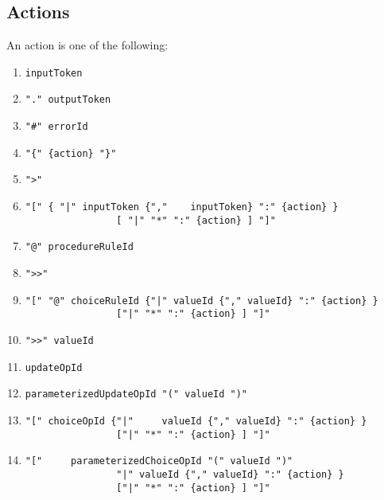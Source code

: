 \subsection{Actions}

An action is one of the following:
\begin{enumerate}
\item 
\begin{verbatim}
inputToken
\end{verbatim}
\item 
\begin{verbatim}
"." outputToken
\end{verbatim}
           
\item 
\begin{verbatim}
"#" errorId
\end{verbatim}
\item 
\begin{verbatim}
"{" {action} "}"
\end{verbatim}
\item 
\begin{verbatim}
">"
\end{verbatim}
\item 
\begin{verbatim}
"[" { "|" inputToken {","    inputToken} ":" {action} }
                [ "|" "*" ":" {action} ] "]"
\end{verbatim}
\item 
\begin{verbatim}
"@" procedureRuleId
\end{verbatim}
\item 
\begin{verbatim}
">>"
\end{verbatim}
\item 
\begin{verbatim}
"[" "@" choiceRuleId {"|" valueId {"," valueId} ":" {action} }
                ["|" "*" ":" {action} ] "]"
\end{verbatim}
                  
\item 
\begin{verbatim}
">>" valueId
\end{verbatim}
\item 
\begin{verbatim}
updateOpId
\end{verbatim}
\item 
\begin{verbatim}
parameterizedUpdateOpId "(" valueId ")"
\end{verbatim}
\item 
\begin{verbatim}
"[" choiceOpId {"|"     valueId {"," valueId} ":" {action} }
                ["|" "*" ":" {action} ] "]"
\end{verbatim}
\item 
\begin{verbatim}
"["     parameterizedChoiceOpId "(" valueId ")"
                "|" valueId {"," valueId} ":" {action} }
                ["|" "*" ":" {action} ] "]"
\end{verbatim}
\end{enumerate}


